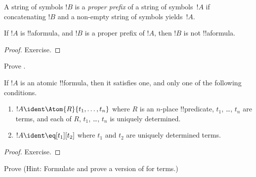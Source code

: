 \documentclass[../../../include/open-logic-section]{subfiles}
\begin{document}
\begin{defn}
A string of symbols $!B$ is a \emph{proper prefix} of a string of symbols~$!A$ if
concatenating $!B$ and a non-empty string of symbols yields~$!A$.
\end{defn}

\begin{lem}
If $!A$ is !!a{formula}, and $!B$ is a proper prefix of $!A$, then
$!B$ is not !!a{formula}.
\end{lem}

\begin{proof}
Exercise.
\end{proof}

\begin{prob}
Prove .
\end{prob}

\begin{prop}
If $!A$ is an atomic !!{formula}, then it satisfies one, and only one
of the following conditions.
\begin{enumerate}
\item $!A \ident \Atom{R}{t_1,\dots,t_n}$ where $R$ is an $n$-place
  !!{predicate}, $t_1$, \dots, $t_n$ are terms, and each of $R$,
  $t_1$, \dots, $t_n$ is uniquely determined.
\item $!A \ident \eq[t_1][t_2]$ where $t_1$ and $t_2$ are uniquely
  determined terms.
\end{enumerate}
\end{prop}

\begin{proof}
Exercise.
\end{proof}

\begin{prob}
Prove  (Hint: Formulate and
prove a version of  for terms.)
\end{prob}
\end{document}
